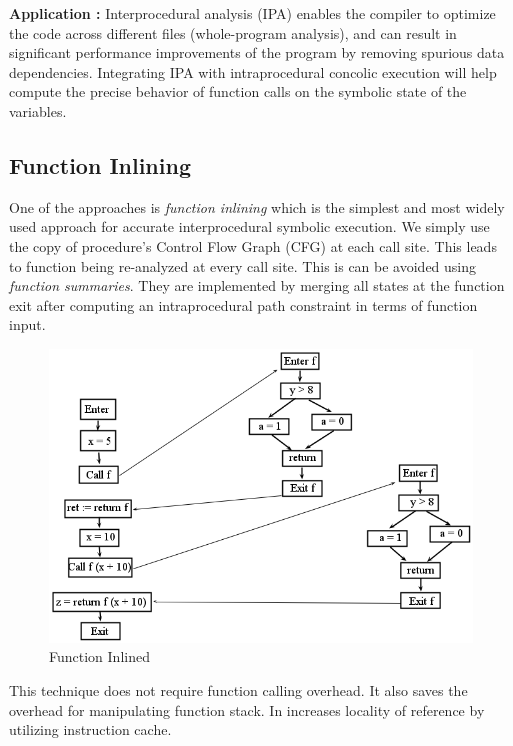 \documentclass[12pt,oneside]{book}
\begin{document}
\textbf{Application :} Interprocedural analysis (IPA) enables the compiler to optimize the code across different files (whole-program analysis), and can result in significant performance improvements of the program by removing spurious data dependencies. Integrating IPA with intraprocedural concolic execution will help compute the precise behavior of function calls on the symbolic state of the variables.


\subsection {Function Inlining}
One of the approaches is \textit{function inlining} which is the simplest and most widely used approach for accurate interprocedural symbolic execution. We simply use the copy of procedure's Control Flow Graph (CFG) at each call site. This leads to function being re-analyzed at every call site. This is can be avoided using \textit{function summaries}. They are implemented by merging all states at the function exit after computing an intraprocedural path constraint in terms of function input.\\ 

\begin{figure}[htbp]
\centering
\includegraphics[scale=0.5]{inlineCFG.png}
\caption{Function Inlined}
\end{figure}

This technique does not require function calling overhead. It also saves the overhead for manipulating function stack. In increases locality of reference by utilizing instruction cache.
\end{document}
